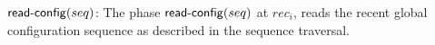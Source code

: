 $\act{read-config}(seq)$: The phase $\act{read-config}(seq)$ at $rec_i$, reads the recent global configuration 
sequence as described in the sequence traversal. 

